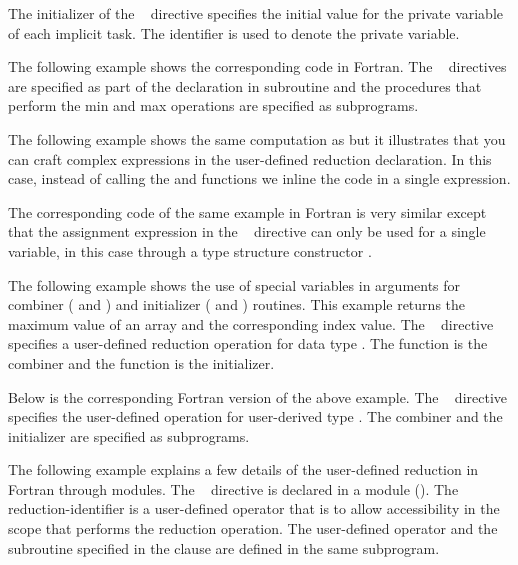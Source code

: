 The initializer of the ~ directive specifies
the initial value for the private variable of each implicit task.
The  identifier is used to denote the private variable.


The following example shows the corresponding code in Fortran. 
The ~ directives are specified as part of 
the declaration in subroutine  and 
the procedures that perform the min and max operations are specified as subprograms.



The following example shows the same computation as  but it illustrates that you can craft complex expressions in the user-defined reduction declaration. In this case, instead of calling the  and  functions we inline the code in a single expression.


The corresponding code of the same example in Fortran is very similar
except that the assignment expression in the ~
directive can only be used for a single variable, in this case through
a type structure constructor .



The following example shows the use of special variables in arguments for combiner ( and ) and initializer ( and ) routines.  This example returns the maximum value of an array and the corresponding index value. The ~ directive specifies a user-defined reduction operation  for data type  . The function  is the combiner and the function  is the initializer.


Below is the corresponding Fortran version of the above example.  The ~ directive specifies the user-defined operation  for user-derived type .  The combiner  and the initializer  are specified as subprograms.



The following example explains a few details of the user-defined reduction 
in Fortran through modules. The ~ directive is declared in a module (). 
The reduction-identifier  is a user-defined operator that is
to allow accessibility in the scope that performs the reduction
operation.
The user-defined operator  and the subroutine  specified in the  clause are defined in the same subprogram.

